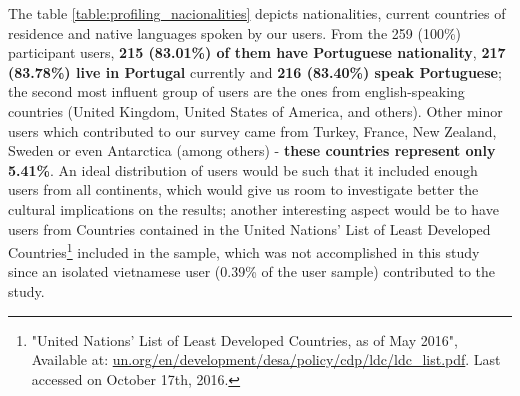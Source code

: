 %
The table \ref{table:profiling_nacionalities} depicts nationalities, current countries of residence and native languages spoken by our users. From the 259 (100\%) participant users,
\textbf{215 (83.01\%) of them have Portuguese nationality}, \textbf{217 (83.78\%) live in Portugal} currently and \textbf{216 (83.40\%) speak Portuguese}; the second most influent group of users are the ones from english-speaking
countries (United Kingdom, United States of America, and others). Other minor users which contributed to our survey came from Turkey, France, New Zealand, Sweden or even Antarctica (among others) -
\textbf{these countries represent only 5.41\%}. An ideal distribution of users would be such that it included enough users from all continents, which would give us room to investigate better the cultural
implications on the results; another interesting aspect would be to have users from Countries contained in the United Nations' List of Least Developed Countries\footnote{"United Nations' List of Least Developed Countries, as of May
2016", Available at: \url{un.org/en/development/desa/policy/cdp/ldc/ldc_list.pdf}. Last accessed on October 17th, 2016.} included in the sample, which was not accomplished in this study since an isolated vietnamese
user (0.39\% of the user sample) contributed to the study.
%
